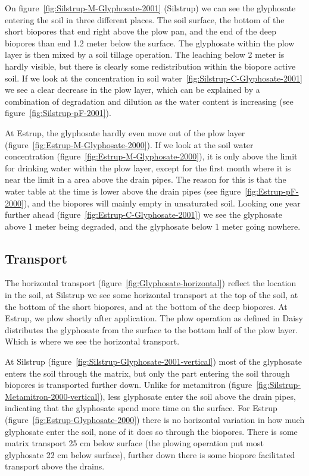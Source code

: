 On figure~\ref{fig:Silstrup-M-Glyphosate-2001} (Silstrup) we can see
the glyphosate entering the soil in three different places.  The soil
surface, the bottom of the short biopores that end right above the
plow pan, and the end of the deep biopores than end 1.2 meter below
the surface.  The glyphosate within the plow layer is then mixed by a
soil tillage operation.  The leaching below 2 meter is hardly visible,
but there is clearly some redistribution within the biopore active
soil.  If we look at the concentration in soil
water~\ref{fig:Silstrup-C-Glyphosate-2001} we see a clear decrease in
the plow layer, which can be explained by a combination of degradation
and dilution as the water content is increasing (see
figure~\ref{fig:Silstrup-pF-2001}).

At Estrup, the glyphosate hardly even move out of the plow layer
(figure~\ref{fig:Estrup-M-Glyphosate-2000}).  If we look at the soil
water concentration (figure~\ref{fig:Estrup-M-Glyphosate-2000}), it is
only above the limit for drinking water within the plow layer, except
for the first month where it is near the limit in a area above the
drain pipes.  The reason for this is that the water table at the time
is lower above the drain pipes (see figure~\ref{fig:Estrup-pF-2000}),
and the biopores will mainly empty in unsaturated soil.  Looking one
year further ahead (figure~\ref{fig:Estrup-C-Glyphosate-2001}) we see
the glyphosate above 1 meter being degraded, and the glyphosate below
1 meter going nowhere.

\subsection{Transport}

The horizontal transport (figure~\ref{fig:Glyphosate-horizontal}) reflect
the location in the soil, at Silstrup we see some horizontal transport at
the top of the soil, at the bottom of the short biopores, and at the
bottom of the deep biopores.  At Estrup, we plow shortly after
application.  The plow operation as defined in Daisy distributes the
glyphosate from the surface to the bottom half of the plow layer.
Which is where we see the horizontal transport.

At Silstrup (figure~\ref{fig:Silstrup-Glyphosate-2001-vertical}) most
of the glyphosate enters the soil through the matrix, but only the
part entering the soil through biopores is transported further down.
Unlike for metamitron
(figure~\ref{fig:Silstrup-Metamitron-2000-vertical}), less glyphosate
enter the soil above the drain pipes, indicating that the glyphosate
spend more time on the surface.  For Estrup
(figure~\ref{fig:Estrup-Glyphosate-2000}) there is no horizontal
variation in how much glyphosate enter the soil, none of it does so
through the biopores.  There is some matrix transport 25 cm below surface
(the plowing operation put most glyphosate 22 cm below surface),
further down there is some biopore facilitated transport above the
drains.

